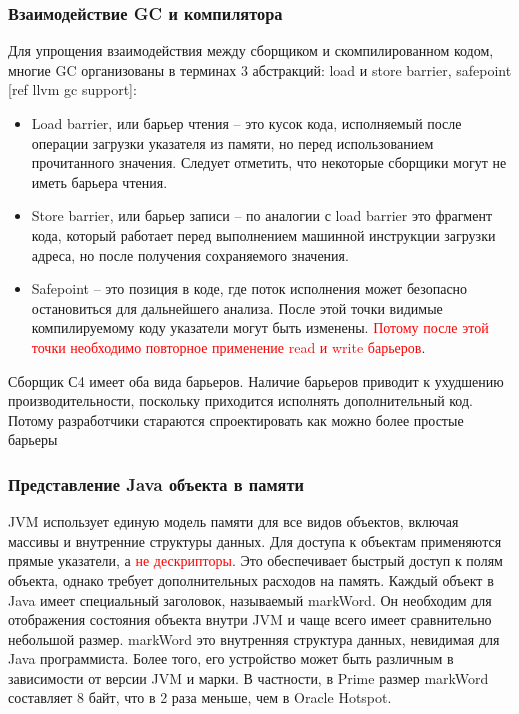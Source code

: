 \subsubsection{Взаимодействие GC и компилятора}
Для упрощения взаимодействия между сборщиком и скомпилированном кодом, многие GC организованы в терминах 3 абстракций: load и store barrier, safepoint [ref llvm gc support]:
\begin{itemize}
	\item Load barrier, или барьер чтения – это кусок кода, исполняемый после операции загрузки указателя из памяти, но перед использованием прочитанного значения. Следует отметить, что некоторые сборщики могут не иметь барьера чтения.
	\item Store barrier, или барьер записи  – по аналогии с load barrier это фрагмент кода, который работает перед выполнением машинной инструкции загрузки адреса, но после получения сохраняемого значения.
	\item Safepoint – это позиция в коде, где поток исполнения может безопасно остановиться для дальнейшего анализа. После этой точки видимые компилируемому коду указатели могут быть изменены. \textcolor{red}{Потому после этой точки необходимо повторное применение read и write барьеров}.
\end{itemize}
Сборщик С4 имеет оба вида барьеров. Наличие барьеров приводит к ухудшению производительности, поскольку приходится исполнять дополнительный код. Потому разработчики стараются спроектировать как можно более простые барьеры

\subsubsection{Представление Java объекта в памяти}
JVM использует единую модель памяти для все видов объектов, включая массивы и внутренние структуры данных. 
Для доступа к объектам применяются прямые указатели, а \textcolor{red}{не дескрипторы}. Это обеспечивает быстрый доступ к полям объекта, однако требует дополнительных расходов на память. Каждый объект в Java имеет специальный заголовок, называемый markWord. Он необходим для отображения состояния объекта внутри JVM и чаще всего имеет сравнительно небольшой размер. markWord это внутренняя структура данных, невидимая для Java программиста. Более того, его устройство может быть различным в зависимости от версии JVM и марки. 
В частности, в Prime размер markWord составляет 8 байт, что в 2 раза меньше, чем в Oracle Hotspot. 

